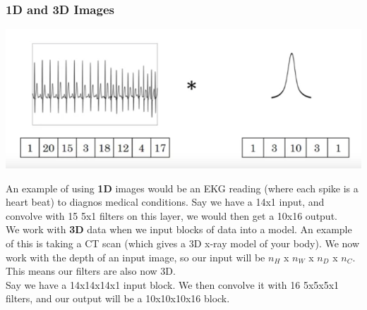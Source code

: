 \documentclass[11pt, a4paper]{article}
\begin{document}
\begin{spacing}{1.1}
	\subsubsection{1D and 3D Images}
	\begin{center}	\includegraphics[scale=0.6]{EKG} \end{center}
	An example of using \textbf{1D} images would be an EKG reading (where each spike is a heart beat) to diagnos medical conditions. Say we have a 14x1 input, and convolve with 15 5x1 filters on this layer, we would then get a 10x16 output. \vspace*{2mm}\\
	We work with \textbf{3D} data when we input blocks of data into a model. An example of this is taking a CT scan (which gives a 3D x-ray model of your body). We now work with the depth of an input image, so our input will be $n_H$ x $n_W$ x $n_D$ x $n_C$. This means our filters are also now 3D. \vspace*{1mm}\\
	Say we have a 14x14x14x1 input block. We then convolve it with 16 5x5x5x1 filters, and our output will be a 10x10x10x16 block. 
	

\end{spacing}
\end{document}
